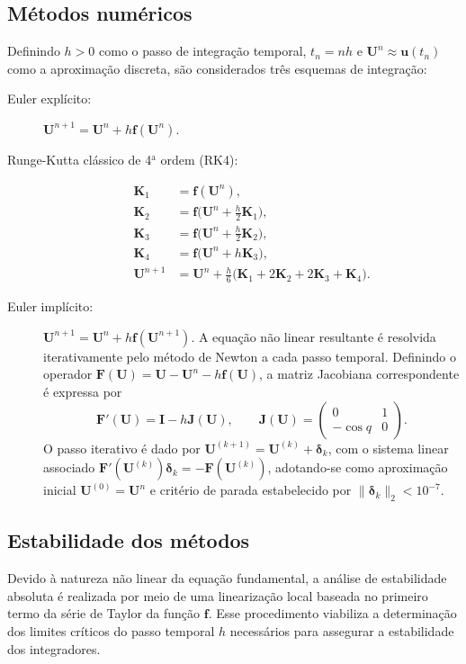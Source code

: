 \documentclass[12pt,a4paper]{article}
\newcommand{\bd}[1]{\textbf{#1}} %
\begin{document}
    \subsection{Métodos numéricos}
    Definindo $h>0$ como o passo de integração temporal, $t_n=nh$ e $\bd{U}^n\approx\bd{u}(t_n)$ como a aproximação discreta, são considerados três esquemas de integração:

    \begin{description}
        \item[Euler explícito:] $\bd{U}^{n+1}=\bd{U}^n+h\bd{f}(\bd{U}^n)$.
        \item[Runge-Kutta clássico de 4$^{\text{a}}$ ordem (RK4):] 
        \begin{align*}
            \bd{K}_1&=\bd{f}(\bd{U}^n),\\
            \bd{K}_2&=\bd{f}\bigl(\bd{U}^n+\tfrac{h}{2}\bd{K}_1\bigr),\\
            \bd{K}_3&=\bd{f}\bigl(\bd{U}^n+\tfrac{h}{2}\bd{K}_2\bigr),\\
            \bd{K}_4&=\bd{f}\bigl(\bd{U}^n+h\bd{K}_3\bigr),\\
            \bd{U}^{n+1}&=\bd{U}^n+\frac{h}{6}\bigl(\bd{K}_1+2\bd{K}_2+2\bd{K}_3+\bd{K}_4\bigr).
        \end{align*}
        \item[Euler implícito:] $\bd{U}^{n+1}=\bd{U}^n+h\bd{f}(\bd{U}^{n+1})$. A equação não linear resultante é resolvida iterativamente pelo método de Newton a cada passo temporal. Definindo o operador $\bd{F}(\bd{U})=\bd{U}-\bd{U}^n-h\bd{f}(\bd{U})$, a matriz Jacobiana correspondente é expressa por
        \begin{equation}
            \bd{F}'(\bd{U})=\bd{I}-h\bd{J}(\bd{U}),\qquad 
            \bd{J}(\bd{U})=\begin{pmatrix}0&1\\ -\cos q&0\end{pmatrix}.
        \end{equation}
        O passo iterativo é dado por $\bd{U}^{(k+1)}=\bd{U}^{(k)}+\boldsymbol\delta_k$, com o sistema linear associado $\bd{F}'(\bd{U}^{(k)})\boldsymbol\delta_k=-\bd{F}(\bd{U}^{(k)})$, adotando-se como aproximação inicial $\bd{U}^{(0)}=\bd{U}^n$ e critério de parada estabelecido por $\|\boldsymbol\delta_k\|_2<10^{-7}$.
    \end{description}

    \subsection{Estabilidade dos métodos}
    Devido à natureza não linear da equação fundamental, a análise de estabilidade absoluta é realizada por meio de uma linearização local baseada no primeiro termo da série de Taylor da função $\bd{f}$. Esse procedimento viabiliza a determinação dos limites críticos do passo temporal $h$ necessários para assegurar a estabilidade dos integradores.
    
\end{document}
